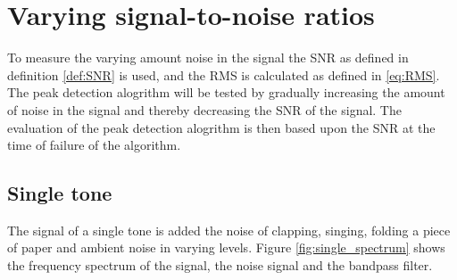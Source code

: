 \section{Varying signal-to-noise ratios}
To measure the varying amount noise in the signal the SNR as defined in definition \ref{def:SNR} is used, and the RMS is calculated as defined in \eqref{eq:RMS}. The peak detection alogrithm will be tested by gradually increasing the amount of noise in the signal and thereby decreasing the SNR of the signal. The evaluation of the peak detection alogrithm is then based upon the SNR at the time of failure of the algorithm.

\subsection{Single tone}
The signal of a single tone is added the noise of clapping, singing, folding a piece of paper and ambient noise in varying levels. Figure \ref{fig:single_spectrum} shows the frequency spectrum of the signal, the noise signal and the bandpass filter.

